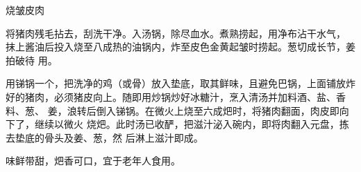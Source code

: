 \begin{recipe}{烧皱皮肉}

\ingredients


\preparation

\step 将猪肉残毛拈去，刮洗干净。入汤锅，除尽血水。煮熟捞起，用净布沾干水气，
抹上酱油后投入烧至八成热的油锅内，炸至皮色金黄起皱时捞起。葱切成长节，姜拍破待
用。

\step 用锑锅一个，把洗净的鸡（或骨）放入垫底，取其鲜味，且避免巴锅，上面铺放炸
好的猪肉，必须猪皮向上。随即用炒锅炒好冰糖汁，烹入清汤并加料酒、盐、香料、葱、
姜，浪转后倒入锑锅。在微火上烧至六成𤆵时，将猪肉翻面，肉皮即向下了，继续以微火
烧𤆵。此时汤已收酽，把滋汁泌入碗内，即将肉翻入元盘，拣去垫底的骨头及姜、葱，然
后淋上滋汁即成。

\features

味鲜带甜，𤆵香可口，宜于老年人食用。

\end{recipe}

